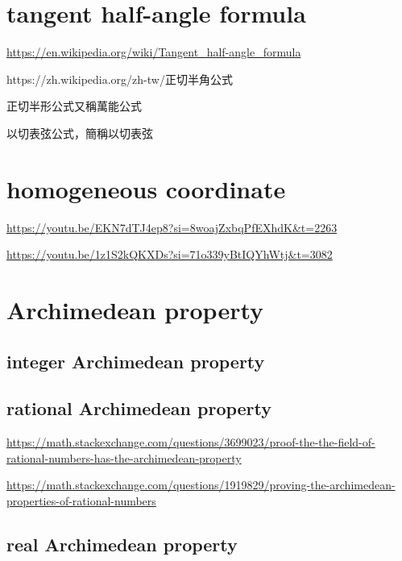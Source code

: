 \documentclass[
]{book}
\theoremstyle{definition}
\theoremstyle{definition}
\theoremstyle{definition}
\theoremstyle{definition}
\theoremstyle{remark}
\begin{document}
\chapter{tangent half-angle formula}\label{tangent-half-angle-formula}

\url{https://en.wikipedia.org/wiki/Tangent_half-angle_formula}

\begin{CJK}{UTF8}{bsmi}

https://zh.wikipedia.org/zh-tw/正切半角公式

正切半形公式又稱萬能公式

以切表弦公式，簡稱以切表弦

\end{CJK}

\chapter{homogeneous coordinate}\label{homogeneous-coordinate-1}

\url{https://youtu.be/EKN7dTJ4ep8?si=8woajZxbqPfEXhdK&t=2263}

\url{https://youtu.be/1z1S2kQKXDs?si=71o339yBtIQYhWtj&t=3082}

\chapter{Archimedean property}\label{archimedean-property}

\section{integer Archimedean property}\label{integer-archimedean-property}

\section{rational Archimedean property}\label{rational-archimedean-property}

\url{https://math.stackexchange.com/questions/3699023/proof-the-the-field-of-rational-numbers-has-the-archimedean-property}

\url{https://math.stackexchange.com/questions/1919829/proving-the-archimedean-properties-of-rational-numbers}

\section{real Archimedean property}\label{real-archimedean-property}
\end{document}
